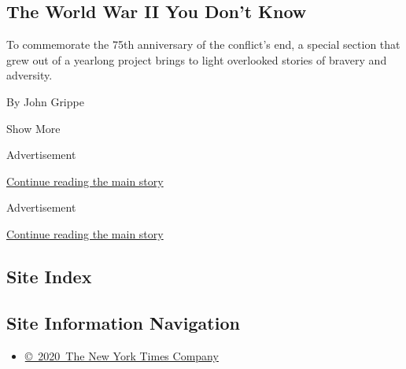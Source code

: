 \begin{enumerate}
  \hypertarget{the-world-war-ii-you-dont-know}{%
  \subsection{The World War II You Don't
  Know}\label{the-world-war-ii-you-dont-know}}

  To commemorate the 75th anniversary of the conflict's end, a special
  section that grew out of a yearlong project brings to light overlooked
  stories of bravery and adversity.

  By John Grippe
\end{enumerate}

Show More

Advertisement

\protect\hyperlink{after-mid1}{Continue reading the main story}

Advertisement

\protect\hyperlink{after-mktg}{Continue reading the main story}

\hypertarget{site-index}{%
\subsection{Site Index}\label{site-index}}

\hypertarget{site-information-navigation}{%
\subsection{Site Information
Navigation}\label{site-information-navigation}}

\begin{itemize}
\tightlist
\item
  \href{https://help.nytimes3xbfgragh.onion/hc/en-us/articles/115014792127-Copyright-notice}{©~2020~The
  New York Times Company}
\end{itemize}


